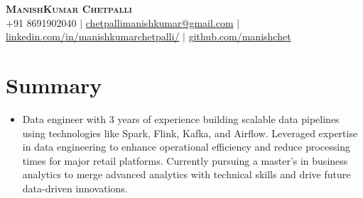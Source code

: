 \documentclass[letterpaper,10pt]{article}
\begin{document}
  \begin{center}
      \textbf{\Huge \scshape ManishKumar Chetpalli} \\ \vspace{4pt}
      \small  +91 8691902040 $|$ \href{mailto:chetpallimanishkumar@gmail.com}{{ chetpallimanishkumar@gmail.com}}  $|$   
      \href{https://www.linkedin.com/in/manishkumarchetpalli}{linkedin.com/in/manishkumarchetpalli/} $|$
      \href{https://github.com/manishchet}{ github.com/manishchet} 
  \end{center}




  \section{Summary}
  \begin{itemize}[leftmargin=0.15in, label={}]
  \item 
  Data engineer with 3 years of experience building scalable data pipelines using technologies like Spark, Flink, Kafka, and Airflow. Leveraged expertise in data engineering to enhance operational efficiency and reduce processing times for major retail platforms. Currently pursuing a master’s in business analytics to merge advanced analytics with technical skills and drive future data-driven innovations.
  \end{itemize}

\end{document}
